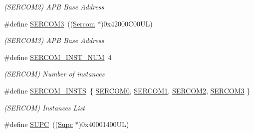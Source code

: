 \begin{DoxyCompactItemize}
\begin{DoxyCompactList}\small\item\em (S\+E\+R\+C\+O\+M2) A\+P\+B Base Address \end{DoxyCompactList}\item 
\hypertarget{group___s_a_m_l21_e18_a__base_gac9f8240be5a40b46cb09617323ebc7e3}{}\#define \hyperlink{group___s_a_m_l21_e18_a__base_gac9f8240be5a40b46cb09617323ebc7e3}{S\+E\+R\+C\+O\+M3}~((\hyperlink{union_sercom}{Sercom}   $\ast$)0x42000\+C00\+U\+L)\label{group___s_a_m_l21_e18_a__base_gac9f8240be5a40b46cb09617323ebc7e3}

\begin{DoxyCompactList}\small\item\em (S\+E\+R\+C\+O\+M3) A\+P\+B Base Address \end{DoxyCompactList}\item 
\hypertarget{group___s_a_m_l21_e18_a__base_ga75f7d8cff25db3f1353efb6f7990fce5}{}\#define \hyperlink{group___s_a_m_l21_e18_a__base_ga75f7d8cff25db3f1353efb6f7990fce5}{S\+E\+R\+C\+O\+M\+\_\+\+I\+N\+S\+T\+\_\+\+N\+U\+M}~4\label{group___s_a_m_l21_e18_a__base_ga75f7d8cff25db3f1353efb6f7990fce5}

\begin{DoxyCompactList}\small\item\em (S\+E\+R\+C\+O\+M) Number of instances \end{DoxyCompactList}\item 
\hypertarget{group___s_a_m_l21_e18_a__base_gadb03dbe1ef2a3400f0a16b58948053a7}{}\#define \hyperlink{group___s_a_m_l21_e18_a__base_gadb03dbe1ef2a3400f0a16b58948053a7}{S\+E\+R\+C\+O\+M\+\_\+\+I\+N\+S\+T\+S}~\{ \hyperlink{group___s_a_m_l21_j18_a__base_gae5473788457bad0e69ad9d7f22ed404f}{S\+E\+R\+C\+O\+M0}, \hyperlink{group___s_a_m_l21_j18_a__base_ga130d7d7bc9ef1da1ba1bd094b42449d7}{S\+E\+R\+C\+O\+M1}, \hyperlink{group___s_a_m_l21_j18_a__base_ga918e4c85993961a115bb23b4bb73a87f}{S\+E\+R\+C\+O\+M2}, \hyperlink{group___s_a_m_l21_j18_a__base_gac9f8240be5a40b46cb09617323ebc7e3}{S\+E\+R\+C\+O\+M3} \}\label{group___s_a_m_l21_e18_a__base_gadb03dbe1ef2a3400f0a16b58948053a7}

\begin{DoxyCompactList}\small\item\em (S\+E\+R\+C\+O\+M) Instances List \end{DoxyCompactList}\item 
\hypertarget{group___s_a_m_l21_e18_a__base_ga7318f2eec4a4b784dc63e9364887faa1}{}\#define \hyperlink{group___s_a_m_l21_e18_a__base_ga7318f2eec4a4b784dc63e9364887faa1}{S\+U\+P\+C}~((\hyperlink{struct_supc}{Supc}     $\ast$)0x40001400\+U\+L)\label{group___s_a_m_l21_e18_a__base_ga7318f2eec4a4b784dc63e9364887faa1}


\end{DoxyCompactItemize}
